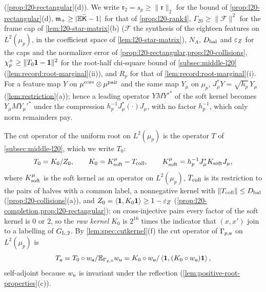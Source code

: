 (\cref{prop:l20-rectangular}(d)). We write $\mathfrak r_2=s_p\ge\|\mathfrak r\|_2$ for the
bound of \cref{prop:l20-rectangular}(d), $\mathfrak m_+\ge|\mathbb E\bar{\mathsf K}-1|$ for that of
\cref{prop:l20-rank4}, $\Gamma_{20}\ge\|\mathcal F\|^2$ for the frame cap of
\cref{lem:l20-star-matrix}(b) ($\mathcal F$ the synthesis of the eighteen features on
$L^2(\mu_p)$, in the coefficient space of \cref{lem:l20-star-matrix}), $N_A$, $D_{\rm bal}$
and $\varepsilon_Z$ for the caps and the normalizer error of
\cref{prop:l20-rectangular,prop:l20-collisions}, $\chi^+_p\ge\|T_0\mathbf 1-\mathbf 1\|^2$ for the
root-half chi-square bound of \cref{subsec:middle-l20} (\cref{lem:record:root-marginal}(ii)),
and $R_p$ for that of \cref{lem:record:root-marginal}(i). For a feature map $Y$ on
$\mu^{\rm core}\otimes\mu^{\rm pair}$ and the same map $Y_\mu$ on $\mu_p$,
$J_\mu^*Y=\sqrt{h_p}\,Y_\mu$ (\cref{lem:restriction}(a)); hence a leading operator
$YMY'^*$ of the soft kernel becomes $Y_\mu MY_\mu'^*$ under the compression
$h_p^{-1}J_\mu^*(\cdot)J_\mu$, with no factor $h_p^{-1}$, which only norm
remainders pay.

The cut operator of the uniform root on $L^2(\mu_p)$ is the operator $T$ of
\cref{subsec:middle-l20}, which we write $T_0$:
\[
 T_0=K_0/Z_0,\qquad K_0=K^\mu_{\rm soft}-T_{\rm coll},\qquad
 K^\mu_{\rm soft}=h_p^{-1}J_\mu^*K_{\rm soft}J_\mu ,
\]
where $K^\mu_{\rm soft}$ is the soft kernel as an operator on $L^2(\mu_p)$, $T_{\rm coll}$ is
its restriction to the pairs of halves with a common label, a nonnegative kernel with
$\|T_{\rm coll}\|\le D_{\rm bal}$ (\cref{prop:l20-collisions}(a)), and
$Z_0=\left\langle \mathbf 1,K_0\mathbf 1\right\rangle\ge1-\varepsilon_Z$ (\cref{prop:l20-completion,prop:l20-rectangular}); on
cross-injective pairs every factor of the soft kernel is $0$ or $2$, so the \emph{raw
kernel} $K_0$ is $2^{16}$ times the indicator that $(x,x')$ join to a
labelling of $G_{\rm L,2}$. By
\cref{lem:spec:cutkernel}(f) the cut operator of $\Gamma_{p,\mathsf u}$ on $L^2(\mu_p)$ is
\[
 T_\mathsf u=T_0\circ w_\mathsf u/\mathbb E_{\Gamma_{p,0}}w_\mathsf u
 =K_0\circ w_\mathsf u/\left\langle \mathbf 1,(K_0\circ w_\mathsf u)\mathbf 1\right\rangle,
\]
self-adjoint because $w_\mathsf u$ is invariant under the reflection
(\cref{lem:positive-root-properties}(c)).

